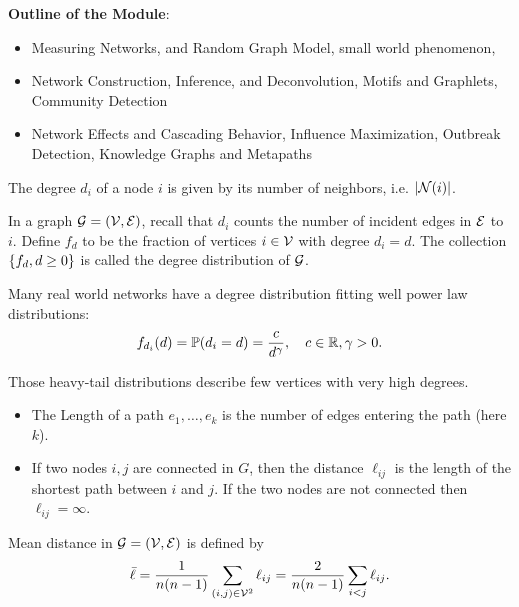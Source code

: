 \documentclass[a4 paper]{article}
\begin{document}
\textbf{Outline of the Module}: 
\begin{itemize}
    \item Measuring Networks, and Random Graph Model, small world phenomenon, 
    \item Network Construction, Inference, and Deconvolution, Motifs and Graphlets, Community Detection
    \item Network Effects and Cascading Behavior, Influence Maximization, Outbreak Detection, Knowledge Graphs and Metapaths
\end{itemize}


\begin{defn}[Degree]
    The degree $d_i$ of a node $i$ is given by its number of neighbors, i.e. $|\mathcal{N}(i)|$.
  \end{defn}
\begin{defn}
    In a graph $\mathcal{G} = (\mathcal{V}, \mathcal{E})$, recall that $d_i$ counts the number of incident edges in $\mathcal{E}$ to $i$. Define $f_d$ to be
    the fraction of vertices $i\in \mathcal{V}$ with degree $d_i=d$. The collection $\left\{f_d, d\geq 0\right\}$ is called the degree distribution of $\mathcal{G}$.
  \end{defn}
  
    Many real world networks have a degree distribution fitting well power law distributions: 
    \[
      f_{d_i}(d) = \mathbb{P}(d_i = d) = \frac{c}{d^\gamma}, \quad c\in\mathbb{R}, \gamma > 0.
    \]

  Those heavy-tail distributions describe few vertices with very high degrees.
  
  \begin{defn}[distance]
    \begin{itemize}
    \item The Length  of a path $e_1,\dots, e_k$ is the number of edges entering the path (here $k$).
    \item If two nodes $i,j$ are connected in $G$, then the distance $\ell_{ij}$ is the length of the shortest path between $i$ and $j$. If the two nodes are not connected then $\ell_{ij} = \infty$.
    \end{itemize}
  \end{defn}
  
  \begin{defn}
    Mean distance in $\mathcal{G} = (\mathcal{V},\mathcal{E})$ is defined by
    \[
      \bar{\ell} = \frac{1}{n(n-1)}\sum_{(i,j)\in\mathcal{V}^2} \ell_{ij} = \frac{2}{n(n-1)}\sum_{i<j} \ell_{ij}.
    \]
  \end{defn}
\end{document}
